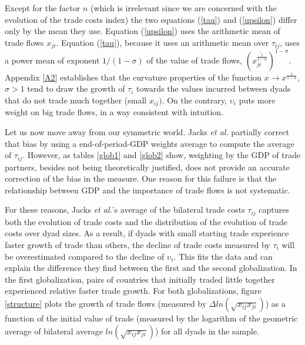 \documentclass{article}
\begin{document}
Except for the factor $n$ (which is irrelevant since we are concerned with the evolution of the trade costs index) the two equations (\ref{tau}) and (\ref{upsilon}) differ only by the mean they use.
Equation (\ref{upsilon}) uses the arithmetic mean of trade flows $x_{ji}$. Equation (\ref{tau}), because it uses an arithmetic mean over $\tau_{ij}$, uses a power mean of exponent  $1/(1-\sigma)$ of the value of trade flows, $\left(\overline{x_{ji}^{\frac{1}{1-\sigma}}}\right)^{1-\sigma}$.
Appendix \ref{A2} establishes that the curvature properties of the function $x \rightarrow x^{\frac{1}{1-\sigma}}$, $\sigma>1$ tend to draw the growth of $\tau_i$ towards the values incurred between dyads that do not trade much together (small $x_{ij})$.
On the contrary, $\upsilon_i$ puts more weight on big trade flows, in a way consistent with intuition.

Let us now move away from our symmetric world. Jacks  \textit{et al.} partially correct that bias by using a end-of-period-GDP weights average to compute the average of  $\tau_{ij}$.
However, as tables \ref{glob1} and \ref{glob2} show, weighting by the GDP of trade partners, besides not being theoretically justified, does not provide an accurate correction of the bias in the measure.
One reason for this failure is that the relationship between GDP and the importance of trade flows is not systematic.

For these reasons, Jacks  \textit{et al.}'s average of the bilateral trade costs $\tau_{ij}$ captures both the evolution of trade costs and the distribution of the evolution of trade costs over dyad sizes.
As a result, if dyads with small starting trade experience faster growth of trade than others, the decline of trade costs measured by $\tau_i$ will be overestimated compared to the decline of $\upsilon_i$.
This fits the data and can explain the difference they find between the first and the second globalization. In the first globalization, pairs of countries that initially traded little together experienced relative faster trade growth.
For both globalizations, figure \ref{structure} plots the growth of trade flows (measured by $\Delta ln (\sqrt{x_{ij} x_{ji}})$) as a function of the initial value of trade (measured by the logarithm of the geometric average of bilateral average $ln(\sqrt{x_{ij} x_{ji}})$) for all dyads in the sample.
\end{document}
